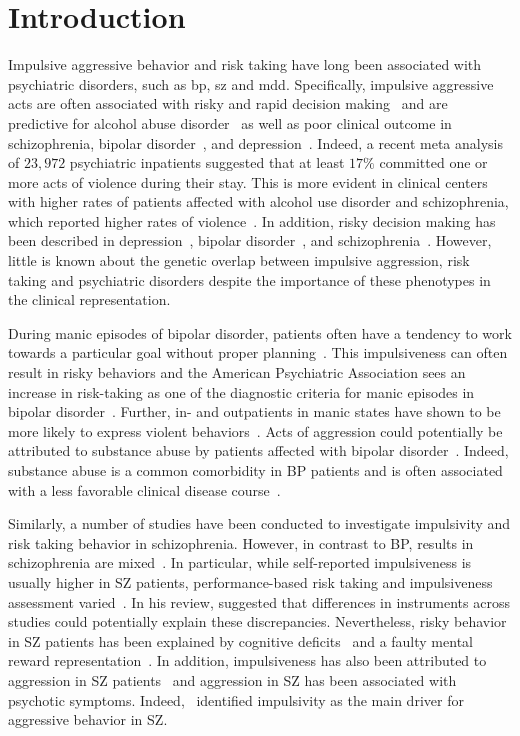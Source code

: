 \section{Introduction}
\label{sec:uk_biobank_psych_introduction}

Impulsive aggressive behavior and risk taking have long been associated with psychiatric disorders, such as \acrfull{bp}, \acrfull{sz} and \acrfull{mdd}.
Specifically, impulsive aggressive acts are often associated with risky and rapid decision making~\cite{Moeller2001} and are predictive for alcohol abuse disorder~\cite{Courtney2012} as well as poor clinical outcome in schizophrenia, bipolar disorder~\cite{Gut-Fayand2001}, and depression~\cite{Dutton2013}.
Indeed, a recent meta analysis of $23,972$ psychiatric inpatients suggested that at least $17\%$ committed one or more acts of violence during their stay.
This is more evident in clinical centers with higher rates of patients affected with alcohol use disorder and schizophrenia, which reported higher rates of violence~\cite{Iozzino2015}. 
In addition, risky decision making has been described in depression~\cite{Wilson2010}, bipolar disorder~\cite{Johnson2012}, and schizophrenia~\cite{Cheng2012}.
However, little is known about the genetic overlap between impulsive aggression, risk taking and psychiatric disorders despite the importance of these phenotypes in the clinical representation.

During manic episodes of bipolar disorder, patients often have a tendency to work towards a particular goal without proper planning~\cite{Johnson2012}.
This impulsiveness can often result in risky behaviors and the American Psychiatric Association sees an increase in risk-taking as one of the diagnostic criteria for manic episodes in bipolar disorder~\cite{APA1994,AmericanPsychiatricAssociation2013}.
Further, in- and outpatients in manic states have shown to be more likely to express violent behaviors~\cite{Ballester2012}.
Acts of aggression could potentially be attributed to substance abuse by patients affected with bipolar disorder~\cite{Fazel2010}.
Indeed, substance abuse is a common comorbidity in BP patients and is often associated with a less favorable clinical disease course~\cite{Cassidy2001}.

Similarly, a number of studies have been conducted to investigate impulsivity and risk taking behavior in schizophrenia.
However, in contrast to BP, results in schizophrenia are mixed~\cite{Reddy2014}.
In particular, while self-reported impulsiveness is usually higher in SZ patients, performance-based risk taking and impulsiveness assessment varied~\cite{Ouzir2013}.
In his review, \citet{Ouzir2013} suggested that differences in instruments across studies could potentially explain these discrepancies.
Nevertheless, risky behavior in SZ patients has been explained by cognitive deficits~\cite{Cheng2012} and a faulty mental reward representation~\cite{Heerey2011}.
In addition, impulsiveness has also been attributed to aggression in SZ patients~\cite{Hoptman2015} and aggression in SZ has been associated with psychotic symptoms.
Indeed,~\citet{Hoptman2015} identified impulsivity as the main driver for aggressive behavior in SZ\@.

